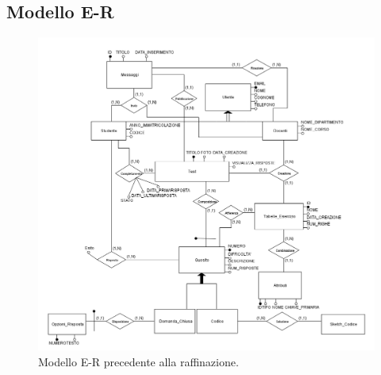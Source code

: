 \documentclass{article}
\begin{document}
\subsection{Modello E-R}
\begin{figure}[H]
    \includegraphics[width=1\textwidth]{foto1.png}
    \caption{Modello E-R precedente alla raffinazione.}
\end{figure}
\end{document}
